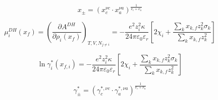\documentclass[12pt, letterpaper]{article}
\begin{document}

\begin{equation}
    x_{\pm}=(x_{c}^{\nu c}\cdot x_{a}^{\nu a})^{\frac{1}{\nu_{c}+\nu_{a}}}
    \label{eq:x_pm_stoich}
\end{equation}


\begin{equation}
    \mu_{i}^{DH}\left(x_{f}\right)=\left(\frac{\partial A^{DH}}{\partial\rho_{i}\left(x_{f}\right)}\right)_{T,V,N_{j\neq i}}=-\frac{e^{2}z_{i}^{2}\kappa}{24\pi\varepsilon_{0}\varepsilon_{r}}\left[2\chi_{i}+\frac{\sum_{k}x_{k,f}z_{k}^{2}\sigma_{k}}{\sum_{k}x_{k,f}z_{k}^{2}}\right]
    \label{eq:mu_dh_infinite_dilution}
\end{equation}


\begin{equation}
    \ln\gamma_{i}^{*}\left(x_{f,i}\right)=-\frac{e^{2}z_{i}^{2}\kappa}{24\pi\varepsilon_{0}\varepsilon_{r}}\left[2\chi_{i}+\frac{\sum_{k}x_{k,f}z_{k}^{2}\sigma_{k}}{\sum_{k}x_{k,f}z_{k}^{2}}\right]
    \label{eq:lngamma_i_infinite_dilution}
\end{equation}


\begin{equation}
    \gamma_{\pm}^{*}=(\gamma_{c}^{*,\nu c}\cdot\gamma_{a}^{*,\nu a})^{\frac{1}{\nu_{c}+\nu_{a}}}
    \label{eq:gamma_pm_x}
\end{equation}
\end{document}
